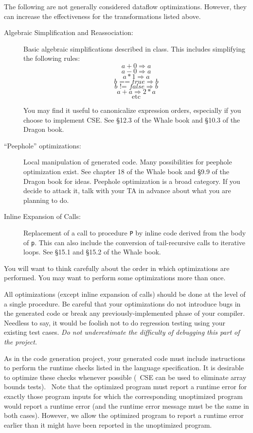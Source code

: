 The following are not generally considered dataflow optimizations.
However, they can increase the effectiveness for the transformations
listed above.

\begin{description}

\item[Algebraic Simplification and Reassociation:] Basic algebraic
simplifications described in class.  This includes simplifying the
following rules:
\[a + 0 \Rightarrow a \]
\[a - 0 \Rightarrow a \]
\[a * 1 \Rightarrow a \]
\[b \textrm{ == } true \Rightarrow b \]
\[b \textrm{ != } false \Rightarrow b \]
\[a + a \Rightarrow 2*a \]
\[\mbox{etc}\]

You may find it useful to canonicalize expression orders, especially
if you choose to implement CSE. See \S 12.3 of the Whale book and
\S 10.3 of the Dragon book.

\item[``Peephole'' optimizations:] Local manipulation of generated code.
Many possibilities for peephole optimization exist. See chapter 18 of
the Whale book and \S 9.9 of the Dragon book for ideas. Peephole
optimization is a broad category.  If you decide to attack it, talk
with your TA in advance about what you are planning to do.

\item[Inline Expansion of Calls:] Replacement of a call to procedure
{\tt P} by inline code derived from the body of {\tt p}.  This can
also include the conversion of tail-recursive calls to iterative
loops. See \S 15.1 and \S 15.2 of the Whale book.

\end{description}

You will want to think carefully about the order in which optimizations
are performed.  You may want to perform some optimizations more than once.

All optimizations (except inline expansion of calls) should be done at the
level of a single procedure.  Be careful that your optimizations do not
introduce bugs in the generated code or break any previously-implemented
phase of your compiler.  Needless to say, it would be foolish not to do
regression testing using your existing test cases.  {\it Do not underestimate
the difficulty of debugging this part of the project.}

As in the code generation project, your generated code must include
instructions to perform the runtime checks listed in the language
specification.  It is desirable to optimize these checks whenever possible
(\eg\ CSE can be used to eliminate array bounds tests).  \ Note that the
optimized program must report a runtime error for exactly those program inputs
for which the corresponding unoptimized program would report a runtime error
(and the runtime error message must be the same in both cases).  However,
we allow the optimized program to report a runtime error earlier than it
might have been reported in the unoptimized program.


